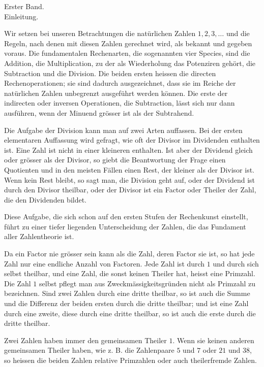 \documentclass[11pt]{article}
\begin{document}
\begin{center}
{\large Erster Band.}\\[0.5em]
{\Large Einleitung.}\\[0.4em]
\end{center}

Wir setzen bei unseren Betrachtungen die natürlichen Zahlen $1,2,3,\ldots$ und die Regeln, nach denen mit diesen Zahlen gerechnet wird, als bekannt und gegeben voraus. Die fundamentalen Rechenarten, die sogenannten vier Species, sind die Addition, die Multiplication, zu der als Wiederholung das Potenziren gehört, die Subtraction und die Division. Die beiden ersten heissen die directen Rechenoperationen; sie sind dadurch ausgezeichnet, dass sie im Reiche der natürlichen Zahlen unbegrenzt ausgeführt werden können. Die erste der indirecten oder inversen Operationen, die Subtraction, lässt sich nur dann ausführen, wenn der Minuend grösser ist als der Subtrahend.

Die Aufgabe der Division kann man auf zwei Arten auffassen. Bei der ersten elementaren Auffassung wird gefragt, wie oft der Divisor im Dividenden enthalten ist. Eine Zahl ist nicht in einer kleineren enthalten. Ist aber der Dividend gleich oder grösser als der Divisor, so giebt die Beantwortung der Frage einen Quotienten und in den meisten Fällen einen Rest, der kleiner als der Divisor ist. Wenn kein Rest bleibt, so sagt man, die Division geht auf, oder der Dividend ist durch den Divisor theilbar, oder der Divisor ist ein Factor oder Theiler der Zahl, die den Dividenden bildet.

Diese Aufgabe, die sich schon auf den ersten Stufen der Rechenkunst einstellt, führt zu einer tiefer liegenden Unterscheidung der Zahlen, die das Fundament aller Zahlentheorie ist.

Da ein Factor nie grösser sein kann als die Zahl, deren Factor sie ist, so hat jede Zahl nur eine endliche Anzahl von Factoren. Jede Zahl ist durch $1$ und durch sich selbst theilbar, und eine Zahl, die sonst keinen Theiler hat, heisst eine Primzahl. Die Zahl $1$ selbst pflegt man aus Zweckmässigkeitsgründen nicht als Primzahl zu bezeichnen. Sind zwei Zahlen durch eine dritte theilbar, so ist auch die Summe und die Differenz der beiden ersten durch die dritte theilbar; und ist eine Zahl durch eine zweite, diese durch eine dritte theilbar, so ist auch die erste durch die dritte theilbar.

Zwei Zahlen haben immer den gemeinsamen Theiler $1$. Wenn sie keinen anderen gemeinsamen Theiler haben, wie z. B. die Zahlenpaare $5$ und $7$ oder $21$ und $38$, so heissen die beiden Zahlen relative Primzahlen oder auch theilerfremde Zahlen.
\end{document}
